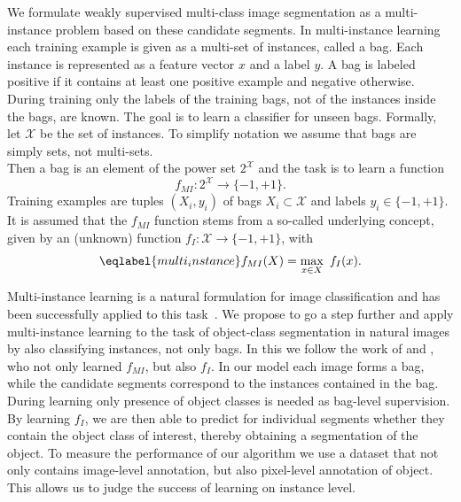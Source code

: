 \enlargethispage{10mm}
We formulate weakly supervised multi-class image segmentation as a
multi-instance problem based on these candidate segments.  In multi-instance
learning~\citep{dietterich1997solving} each training example is given as a
multi-set of instances, called a bag.  Each instance is represented as a
feature vector $x$ and a label $y$.
A bag is labeled positive if it contains at least one positive example and
negative otherwise.  During training only the labels of the training bags, not
of the instances inside the bags, are known.  The goal is to learn a classifier
for unseen bags. 
Formally, let $\mathcal{X}$ be the set of instances. To simplify notation we
assume that bags are simply sets, not multi-sets.
\pagebreak\\
Then a bag is an element of
the power set $2^\mathcal{X}$ and the task is to learn a function
\begin{equation} f_{MI} \colon 2^\mathcal{X} \rightarrow \{-1,+1\}.  \end{equation}
Training examples are tuples $(X_i,y_i)$ of bags $X_i \subset \mathcal{X}$ and
labels $y_i \in \{-1,+1\}$.  It is assumed that the $f_{MI}$ function stems
from a so-called underlying concept, given by an (unknown) function
$f_{I} \colon \mathcal{X} \rightarrow \{-1,+1\}$, with 
\begin{equation}\eqlabel{multi_instance}
f_{MI}(X)= \max_{x \in X}\ f_{I}(x).
\end{equation}

Multi-instance learning is a natural formulation for image classification and
has been successfully applied to this task~\citep{zhou2007multi}. We propose to
go a step further and apply multi-instance learning to the task of object-class
segmentation in natural images by also classifying instances, not only bags.
In this we follow the work of \citet{liconvex2010} and \citet{zha2008joint}, who not
only learned $f_{MI}$, but also $f_{I}$.
In our model each image forms a bag, while the candidate segments correspond
to the instances contained in the bag. During learning only presence of object
classes is needed as bag-level supervision. By learning $f_{I}$, we are then
able to predict for individual segments whether they contain the object class
of interest, thereby obtaining a segmentation of the object.
To measure the performance of our algorithm we use a dataset that not only contains
image-level annotation, but also pixel-level annotation of object. This allows
us to judge the success of learning on instance level.

